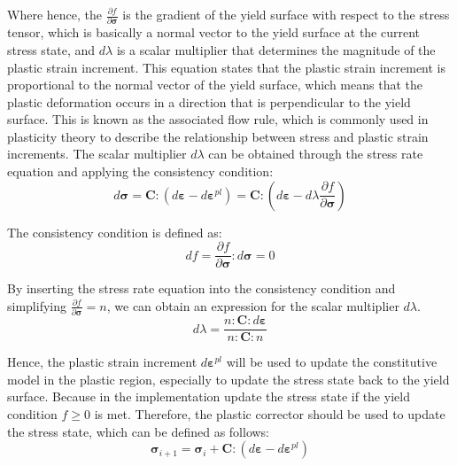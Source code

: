 \documentclass[12pt]{article}
\begin{document}
Where hence, the $\frac{\partial f}{\partial \boldsymbol{\sigma}}$ is the gradient of the yield surface with respect to the stress tensor, which 
is basically a normal vector to the yield surface at the current stress state, and $d \lambda$ is a 
scalar multiplier that determines the magnitude of the plastic strain increment. 
This equation states that the plastic strain increment is proportional to the normal 
vector of the yield surface, which means that the plastic deformation occurs in a direction that is 
perpendicular to the yield surface. This is known as the associated flow rule, 
which is commonly used in plasticity theory to describe the relationship between stress 
and plastic strain increments. The scalar multiplier $d \lambda$ can be obtained through the
stress rate equation and applying the consistency condition:
\begin{equation}
    d \boldsymbol{\sigma} = \boldsymbol{C} : (d \boldsymbol{\varepsilon} - d \boldsymbol{\varepsilon}^{pl}) = \boldsymbol{C} : (d \boldsymbol{\varepsilon} - d \lambda \frac{\partial f}{\partial \boldsymbol{\sigma}})
\end{equation}

The consistency condition is defined as:
\begin{equation}
    df = \frac{\partial f}{\partial \boldsymbol{\sigma}} : d \boldsymbol{\sigma} = 0
\end{equation}

By inserting the stress rate equation into the consistency condition and simplifying $\frac{\partial f}{\partial \boldsymbol{\sigma}} = n$, we can obtain an expression for the scalar multiplier $d \lambda$.
\begin{equation}
    d \lambda = \frac{n : \boldsymbol{C} : d \boldsymbol{\varepsilon}}{n : \boldsymbol{C} : n}
\end{equation}

Hence, the plastic strain increment $d \boldsymbol{\varepsilon}^{pl}$ will be used to update the constitutive 
model in the plastic region, especially to update the stress state back to the yield surface. Because in the implementation
update the stress state if the yield condition $f \geq 0$ is met. Therefore, the plastic corrector should be used to update
the stress state, which can be defined as follows:
\begin{equation}
    \boldsymbol{\sigma}_{i+1} = \boldsymbol{\sigma}_{i} + \boldsymbol{C} : (d \boldsymbol{\varepsilon} - d \boldsymbol{\varepsilon}^{pl})
\end{equation}
\end{document}

